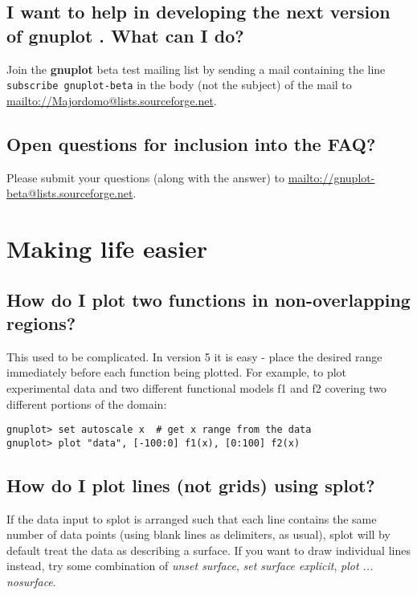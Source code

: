 \documentclass[a4paper,11pt]{article}
\def\mailto#1{{\small\href{mailto://#1}{\url{mailto://#1}}}}
\newcommand{\mailto}[1]%
            {\htmladdnormallink{\latex{\url{<#1>}}\html{\textit{#1}}}%
                {mailto:#1}%
            }
\newcommand{\gnuplot}{\textbf{gnuplot }}
\begin{document}
\subsection{I want to help in developing the next version of \gnuplot.
What can I do?}

Join the \gnuplot beta test mailing list by sending a mail
containing the line
\verb+subscribe gnuplot-beta+
in the body (not the subject) of the mail to
\mailto{Majordomo@lists.sourceforge.net}.


\subsection{Open questions for inclusion into the FAQ?}



Please submit your questions (along with the answer) to 
\mailto{gnuplot-beta@lists.sourceforge.net}.


\section{Making life easier}

\subsection{How do I plot two functions in non-overlapping regions?}

This used to be complicated.  In version 5 it is easy - place the
desired range immediately before each function being plotted.
For example, to plot experimental data and two different functional
models f1 and f2 covering two different portions of the domain:
\small
\begin{verbatim}
gnuplot> set autoscale x  # get x range from the data
gnuplot> plot "data", [-100:0] f1(x), [0:100] f2(x)
\end{verbatim}
\normalsize


\subsection{How do I plot lines (not grids) using splot?}

If the data input to splot is arranged such that each line contains
the same number of data points (using blank lines as delimiters, as usual),
splot will by default treat the data as describing a surface.
If you want to draw individual lines instead, try some combination of
\textit{unset surface}, \textit{set surface explicit}, \textit{plot ... nosurface}.
\end{document}
